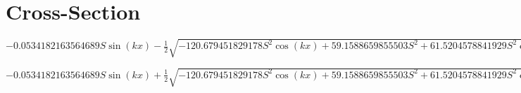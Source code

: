 \documentclass[12pt]{article}
\begin{document}
\section{Cross-Section}

$- 0.0534182163564689 S \operatorname{sin}\left(kx\right) - \frac{1}{2} \sqrt{- 120.679451829178 S^{2} \operatorname{cos}\left(kx\right) + 59.1588659855503 S^{2} + 61.5204578841929 S^{2} \operatorname{cos}^{2}\left(kx\right)}$

$- 0.0534182163564689 S \operatorname{sin}\left(kx\right) + \frac{1}{2} \sqrt{- 120.679451829178 S^{2} \operatorname{cos}\left(kx\right) + 59.1588659855503 S^{2} + 61.5204578841929 S^{2} \operatorname{cos}^{2}\left(kx\right)}$
\end{document}
